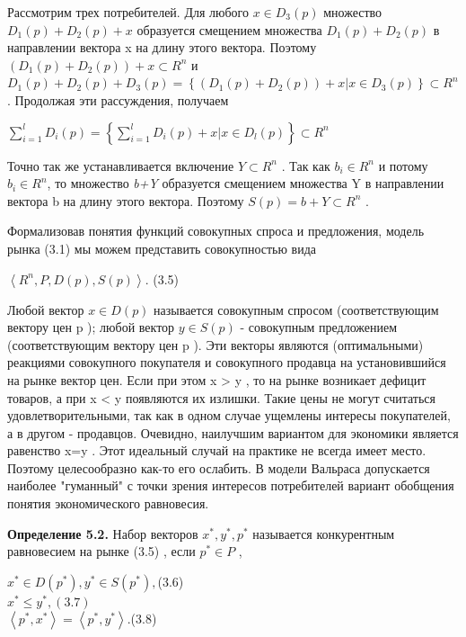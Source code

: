 \documentclass[12pt, 4paper]{book}
\begin{document}
{Рассмотрим трех потребителей. Для любого $x \in D_3(p)$ множество $D_1(p)+D_2(p)+x$ образуется смещением множества $D_1(p)+D_2(p)$ в направлении вектора x на длину этого вектора. Поэтому $(D_1(p)+D_2(p))+x \subset R^n$ и
$D_1(p)+D_2(p)+D_3(p)=\left\{(D_1(p)+D_2(p))+x|x \in D_3(p) \right\} \subset R^n$.
Продолжая эти рассуждения, получаем
\begin{center}
$\sum\limits_{i=1}^{l}D_i(p)=\left\{\sum\limits_{i=1}^{l}D_i(p)+ x|x \in D_l(p)\right\} \subset R^n$
\end{center}
\par

Точно так же устанавливается включение $Y \subset R^n$ . Так как $b_i \in R^n$ и потому $b_i \in R^n$, то множество \textit{b+Y} образуется смещением множества Y в направлении вектора b на длину этого вектора. Поэтому $S(p)=b+Y \subset R^n$ .
\par

Формализовав понятия функций совокупных спроса и предложения, модель рынка (3.1) мы можем представить совокупностью вида
\begin{center}
$\left\langle  R^n,P,D(p),S(p) \right\rangle$. (3.5)
\end{center}
\par

Любой вектор $x \in D(p)$ называется совокупным спросом (соответствующим вектору цен p ); любой вектор $y \in S(p)$ - совокупным предложением (соответствующим вектору цен p ). Эти векторы являются (оптимальными) реакциями совокупного покупателя и совокупного продавца на установившийся на рынке вектор цен. Если при этом x > y , то на рынке возникает дефицит товаров, а при x < y появляются их излишки. Такие цены не могут считаться удовлетворительными, так как в одном случае ущемлены интересы покупателей, а в другом - продавцов. Очевидно, наилучшим вариантом для экономики является равенство x=y . Этот идеальный случай на практике не всегда имеет место. Поэтому целесообразно как-то его ослабить. В модели Вальраса допускается наиболее "гуманный" с точки зрения интересов потребителей вариант обобщения понятия экономического равновесия.
\par

\textbf{Определение 5.2.} Набор векторов $x^{*},y^{*},p^{*}$ называется конкурентным равновесием на рынке (3.5) , если $p^{*} \in P$ ,
\begin{center}
$x^{*} \in D(p^{*}),y^{*} \in S(p^{*}),$(3.6)  \\
$x^{*} \leq y^{*},(3.7) $ \\
$\left\langle p^{*},x^{*}\right\rangle = \left\langle  p^{*},y^{*}\right\rangle.$(3.8) 
\end{center}
\par

}
\end{document}
